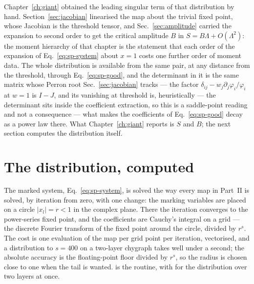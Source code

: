Chapter~\ref{ch:giant} obtained the leading singular term of that
distribution by hand. Section~\ref{sec:jacobian} linearised the map about the
trivial fixed point, whose Jacobian is the threshold tensor, and
Sec.~\ref{sec:amplitude} carried the expansion to second order to get the
critical amplitude $B$ in $S=B\Lambda+O(\Lambda^{2})$: the moment hierarchy
of that chapter is the statement that each order of the expansion of
Eq.~\eqref{eq:sp-system} about $x=1$ costs one further order of moment data.
The whole distribution is available from the same pair, at any distance from
the threshold, through Eq.~\eqref{eq:sp-good}, and the determinant in it is
the same matrix whose Perron root Sec.~\ref{sec:jacobian} tracks --- the
factor $\delta_{ij}-w_{j}\partial_{j}\varphi_{i}/\varphi_{i}$ at $w=1$ is
$I-J$, and its vanishing at threshold is, heuristically --- the determinant
sits inside the coefficient extraction, so this is a saddle-point reading
and not a consequence --- what makes the coefficients of
Eq.~\eqref{eq:sp-good} decay as a power law there. What
Chapter~\ref{ch:giant} reports is $S$ and $B$; the next section computes
the distribution itself.


\section{The distribution, computed}
\label{sec:sp-computed}

The marked system, Eq.~\eqref{eq:sp-system}, is solved the way every map in
Part~II is solved, by iteration from zero, with one change: the marking
variables are placed on a circle $|x_{l}|=r<1$ in the complex plane. There
the iteration converges to the power-series fixed point, and the
coefficients are Cauchy's integral on a grid --- the discrete Fourier
transform of the fixed point around the circle, divided by $r^{s}$. The
cost is one evaluation of the map per grid point per iteration, vectorised,
and a distribution to $s=400$ on a two-layer chygraph takes well under a
second; the absolute accuracy is the floating-point floor divided by
$r^{s}$, so the radius is chosen close to one when the tail is wanted.
 is the routine, with  for
the distribution over two layers at once.

